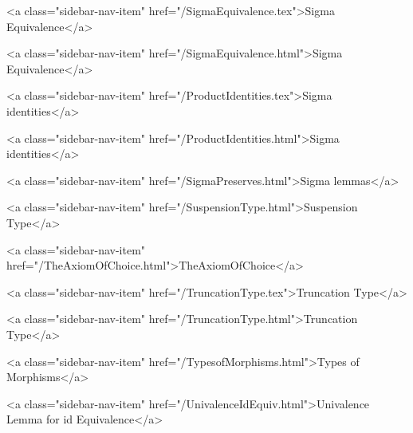       
    
      
        
          <a class="sidebar-nav-item" href="/SigmaEquivalence.tex">Sigma Equivalence</a>
        
      
    
      
        
          <a class="sidebar-nav-item" href="/SigmaEquivalence.html">Sigma Equivalence</a>
        
      
    
      
        
          <a class="sidebar-nav-item" href="/ProductIdentities.tex">Sigma identities</a>
        
      
    
      
        
          <a class="sidebar-nav-item" href="/ProductIdentities.html">Sigma identities</a>
        
      
    
      
        
          <a class="sidebar-nav-item" href="/SigmaPreserves.html">Sigma lemmas</a>
        
      
    
      
        
          <a class="sidebar-nav-item" href="/SuspensionType.html">Suspension Type</a>
        
      
    
      
        
          <a class="sidebar-nav-item" href="/TheAxiomOfChoice.html">TheAxiomOfChoice</a>
        
      
    
      
        
          <a class="sidebar-nav-item" href="/TruncationType.tex">Truncation Type</a>
        
      
    
      
        
          <a class="sidebar-nav-item" href="/TruncationType.html">Truncation Type</a>
        
      
    
      
        
          <a class="sidebar-nav-item" href="/TypesofMorphisms.html">Types of Morphisms</a>
        
      
    
      
        
          <a class="sidebar-nav-item" href="/UnivalenceIdEquiv.html">Univalence Lemma for id Equivalence</a>
        
